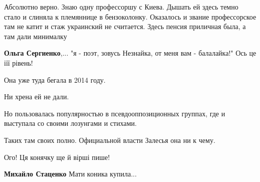 \begin{itemize}
\begin{itemize}
Абсолютно верно. Знаю одну профессоршу с Киева. Дышать ей здесь темно стало и слиняла к племяннице в бензоколонку. Оказалось и звание профессорское там не катит и стаж украинский не считается. Здесь пенсия приличная была, а там дали минималку

 
\textbf{Ольга Сергиенко},... "я - поэт, зовусь Незнайка, от меня вам - балалайка!"
Ось це іїї рівень!
\end{itemize}

 
Она уже туда бегала в 2014 году.

Ни хрена ей не дали.

Но пользовалась популярностью в псевдооппозиционных группах, где и выступала со
своими лозунгами и стихами.

Таких там своих полно. Официальной власти Залесья она ни к чему.

 
Ого! Ця конячку ще й вірші пише!

\begin{itemize}
 
\textbf{Михайло Стаценко} Мати коника купила...
\end{itemize}

 


\end{itemize}
